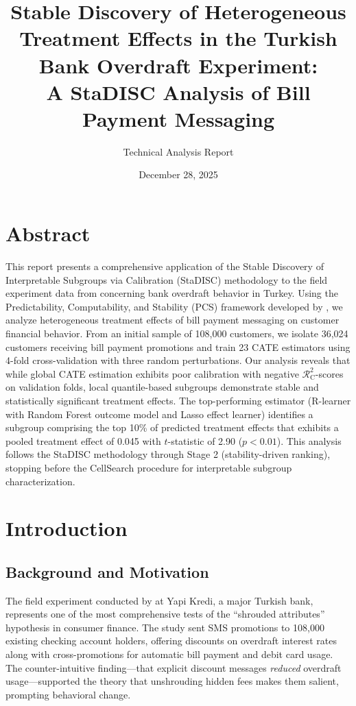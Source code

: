 \documentclass[11pt,a4paper]{article}
\title{Stable Discovery of Heterogeneous Treatment Effects in the Turkish Bank Overdraft Experiment: \\ A StaDISC Analysis of Bill Payment Messaging}
\author{Technical Analysis Report}
\date{December 28, 2025}
\newcommand{\rsquare}{\ensuremath{\mathcal{R}^2_{\mathrm{C}}}}
\begin{document}
	
\maketitle
	
\section*{Abstract}
This report presents a comprehensive application of the Stable Discovery of Interpretable Subgroups via Calibration (StaDISC) methodology to the field experiment data from \citet{alan2018} concerning bank overdraft behavior in Turkey. Using the Predictability, Computability, and Stability (PCS) framework developed by \citet{dwivedi2020}, we analyze heterogeneous treatment effects of bill payment messaging on customer financial behavior. From an initial sample of 108,000 customers, we isolate 36,024 customers receiving bill payment promotions and train 23 CATE estimators using 4-fold cross-validation with three random perturbations. Our analysis reveals that while global CATE estimation exhibits poor calibration with negative $\rsquare$-scores on validation folds, local quantile-based subgroups demonstrate stable and statistically significant treatment effects. The top-performing estimator (R-learner with Random Forest outcome model and Lasso effect learner) identifies a subgroup comprising the top 10\% of predicted treatment effects that exhibits a pooled treatment effect of 0.045 with $t$-statistic of 2.90 ($p < 0.01$). This analysis follows the StaDISC methodology through Stage 2 (stability-driven ranking), stopping before the CellSearch procedure for interpretable subgroup characterization.

\section{Introduction}

\subsection{Background and Motivation}
The field experiment conducted by \citet{alan2018} at Yapi Kredi, a major Turkish bank, represents one of the most comprehensive tests of the ``shrouded attributes'' hypothesis in consumer finance. The study sent SMS promotions to 108,000 existing checking account holders, offering discounts on overdraft interest rates along with cross-promotions for automatic bill payment and debit card usage. The counter-intuitive finding---that explicit discount messages \emph{reduced} overdraft usage---supported the theory that unshrouding hidden fees makes them salient, prompting behavioral change.
\end{document}
